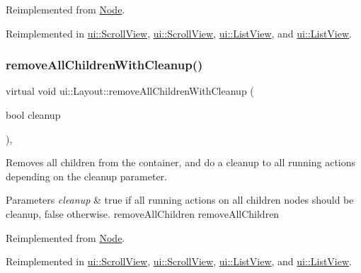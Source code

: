 Reimplemented from \hyperlink{classNode_aca66e2b385c3dbf1a6f55627c4a13192}{Node}.



Reimplemented in \hyperlink{classui_1_1ScrollView_ab72a5f9a41f99b6b8c41596bacdd116f}{ui\+::\+Scroll\+View}, \hyperlink{classui_1_1ScrollView_ac71d0fe89be6291abbccf6a6f8f011b4}{ui\+::\+Scroll\+View}, \hyperlink{classui_1_1ListView_a04bcc9bd8c55dea8f034a8380b3ab3a8}{ui\+::\+List\+View}, and \hyperlink{classui_1_1ListView_a01691c095058bc86f372e6439b15b151}{ui\+::\+List\+View}.

\mbox{\label{classui_1_1Layout_a7dcfdbe18bfc9e55169e957597aa19ca}} 
\subsubsection{\texorpdfstring{remove\+All\+Children\+With\+Cleanup()}{removeAllChildrenWithCleanup()}\hspace{0.1cm}{\footnotesize\ttfamily [2/2]}}
{\footnotesize\ttfamily virtual void ui\+::\+Layout\+::remove\+All\+Children\+With\+Cleanup (\begin{DoxyParamCaption}\item[{bool}]{cleanup }\end{DoxyParamCaption})\hspace{0.3cm}{\ttfamily [override]}, {\ttfamily [virtual]}}

Removes all children from the container, and do a cleanup to all running actions depending on the cleanup parameter.


\begin{DoxyParams}{Parameters}
{\em cleanup} & true if all running actions on all children nodes should be cleanup, false otherwise.  remove\+All\+Children  remove\+All\+Children \\
\hline
\end{DoxyParams}


Reimplemented from \hyperlink{classNode_aca66e2b385c3dbf1a6f55627c4a13192}{Node}.



Reimplemented in \hyperlink{classui_1_1ScrollView_ab72a5f9a41f99b6b8c41596bacdd116f}{ui\+::\+Scroll\+View}, \hyperlink{classui_1_1ScrollView_ac71d0fe89be6291abbccf6a6f8f011b4}{ui\+::\+Scroll\+View}, \hyperlink{classui_1_1ListView_a04bcc9bd8c55dea8f034a8380b3ab3a8}{ui\+::\+List\+View}, and \hyperlink{classui_1_1ListView_a01691c095058bc86f372e6439b15b151}{ui\+::\+List\+View}.

